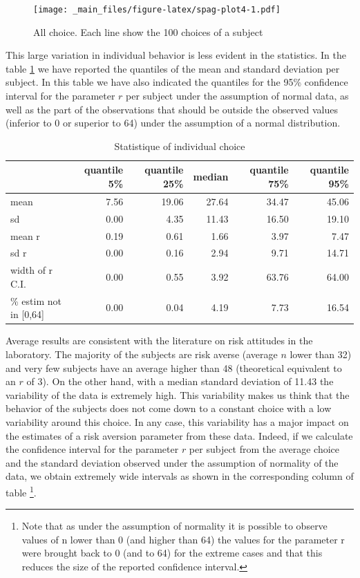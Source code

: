 \documentclass[
]{book}
\begin{document}
\begin{figure}
\centering
\texttt{[image: \_main\_files/figure-latex/spag-plot4-1.pdf]}
\caption{\label{fig:spag-plot4}All choice. Each line show the 100 choices of a subject}
\end{figure}

This large variation in individual behavior is less evident in the
statistics.
In the table \ref{tab:sum-stat-table4} we have reported the
quantiles of the mean and standard deviation per subject.
In this table we have also indicated the quantiles for the 95\% confidence
interval for the parameter \(r\) per subject under the assumption of normal data,
as well as the part of the observations that should be outside the observed
values (inferior to 0 or superior to 64) under the assumption of a normal
distribution.

\begin{table}

\caption{\label{tab:sum-stat-table4}Statistique of individual choice}
\centering
\begin{tabular}[t]{l|r|r|r|r|r}
\hline
  & quantile 5\% & quantile 25\% & median & quantile 75\% & quantile 95\%\\
\hline
mean & 7.56 & 19.06 & 27.64 & 34.47 & 45.06\\
\hline
sd & 0.00 & 4.35 & 11.43 & 16.50 & 19.10\\
\hline
mean r & 0.19 & 0.61 & 1.66 & 3.97 & 7.47\\
\hline
sd r & 0.00 & 0.16 & 2.94 & 9.71 & 14.71\\
\hline
width of r C.I. & 0.00 & 0.55 & 3.92 & 63.76 & 64.00\\
\hline
\% estim not in [0,64] & 0.00 & 0.04 & 4.19 & 7.73 & 16.54\\
\hline
\end{tabular}
\end{table}

Average results are consistent with
the literature on risk attitudes in the laboratory. The majority of the subjects
are risk averse (average \(n\) lower than 32) and very few subjects have an
average higher than 48 (theoretical equivalent to an \(r\) of 3). On the
other hand, with a median standard deviation of
11.43 the variability of the data is
extremely high. This variability makes us think that the behavior of the
subjects does not come down to a constant choice with a low variability
around this choice. In any case, this variability has a major impact on
the estimates of a risk aversion parameter from these data. Indeed, if we
calculate the confidence interval for the parameter \(r\) per subject from
the average choice and the standard deviation observed under the
assumption of normality of the data, we obtain extremely wide intervals
as shown in the corresponding column of table \footnote{Note that as under the assumption of normality it is possible to
  observe values of n lower than 0 (and higher than 64) the values for
  the parameter r were brought back to 0 (and to 64) for the extreme
  cases and that this reduces the size of the reported confidence
  interval.}.
\end{document}
